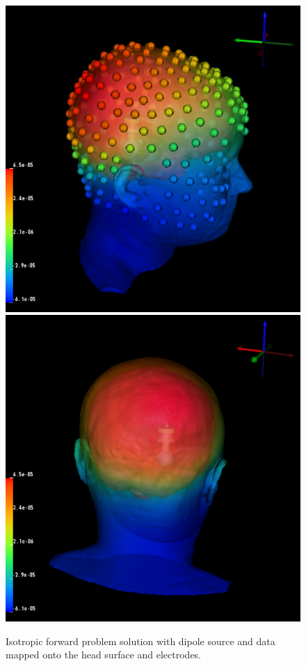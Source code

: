 \begin{figure}[H]
\begin{center}
\includegraphics[width=.49\textwidth]{Figures/iso_dipole}
\includegraphics[width=.49\textwidth]{Figures/iso_dipole_2}
\caption{Isotropic forward problem solution with dipole source and data mapped onto the head surface and electrodes.}
\label{fig:isodip}
\end{center}
\end{figure}

